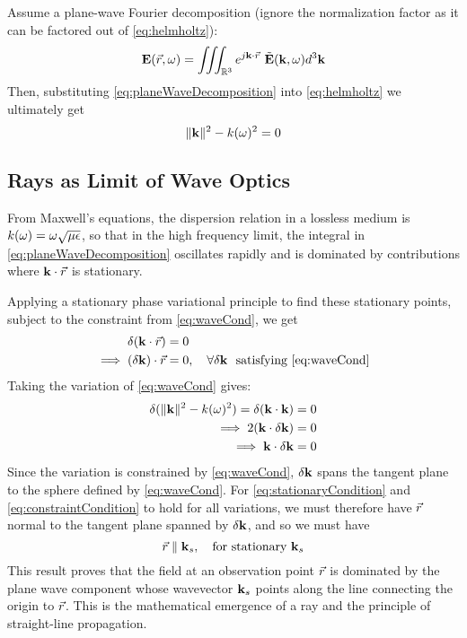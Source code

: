 \documentclass{article}
\DeclarePairedDelimiter\norm{\lVert}{\rVert}
\begin{document}
Assume a plane-wave Fourier decomposition (ignore the normalization factor as it can
be factored out of \eqref{eq:helmholtz}):
\begin{equation}
   \mathbf{E}( \vec{r}, \omega ) = \iiint_{\mathbb{R}^3} e^{j \mathbf{k} \cdot \vec{r}} \ \tilde{\mathbf{E}}(
      \mathbf{k}, \omega ) d^3 \mathbf{k}
   \label{eq:planeWaveDecomposition}
\end{equation}
Then, substituting \eqref{eq:planeWaveDecomposition} into \eqref{eq:helmholtz} we
ultimately get
\begin{equation}
   \norm{\wavevec}^2 - \wavenum^2 = 0
   \label{eq:waveCond}
\end{equation}
\subsection{Rays as Limit of Wave Optics}
From Maxwell's equations, the dispersion relation in a lossless medium is $k( \omega ) =
\omega \sqrt{\mu \epsilon}$, so that in the high frequency limit, the integral in
\eqref{eq:planeWaveDecomposition} oscillates rapidly and is dominated by
contributions where $\mathbf{k} \cdot \vec{r}$ is stationary. 

Applying a stationary phase variational principle to find these stationary points,
subject to the constraint from \eqref{eq:waveCond}, we get
\begin{align}
   \delta(\mathbf{k} \cdot \vec{r}) &= 0 \nonumber \\
   \implies (\delta \mathbf{k}) \cdot \vec{r} &= 0, \quad \forall \delta \mathbf{k} \ \text{
      satisfying \eqref{eq:waveCond}}
\label{eq:stationaryCondition}
\end{align}
Taking the variation of \eqref{eq:waveCond} gives:
\begin{align}
   \delta (\norm{\wavevec}^2 - \wavenum^2) = \delta(\wavevec \cdot \wavevec) &= 0
      \nonumber \\
   \implies 2(\wavevec \cdot \delta \wavevec) &= 0 \nonumber \\
   \implies \wavevec \cdot \delta \wavevec&=0
\label{eq:constraintCondition}
\end{align}
Since the variation is constrained by \eqref{eq:waveCond}, $\delta \mathbf{k}$ spans the
tangent plane to the sphere defined by \eqref{eq:waveCond}. For
\eqref{eq:stationaryCondition} and \eqref{eq:constraintCondition} to hold for all
variations, we must therefore have $\vec{r}$ normal to the tangent plane spanned by
$\delta \mathbf{k}$, and so we must have
\begin{equation}
   \vec{r} \parallel \mathbf{k}_s, \quad \text{for stationary } \mathbf{k}_s
\label{eq:rayCondition}
\end{equation}
This result proves that the field at an observation point $\vec{r}$ is dominated by the
plane wave component whose wavevector $\mathbf{k}_s$ points along the line connecting
the origin to $\vec{r}$. This is the mathematical emergence of a ray and the principle
of straight-line propagation.
\end{document}
